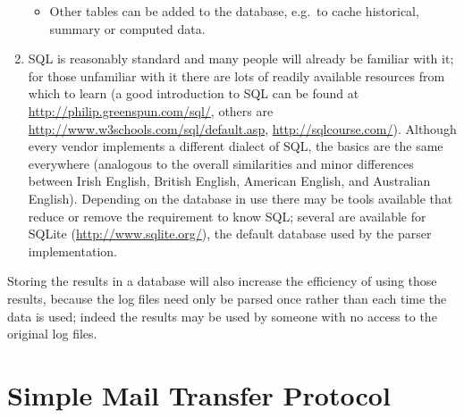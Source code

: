 \begin{enumerate}
\begin{itemize}
            \item Other tables can be added to the database, e.g.\ to cache
                historical, summary or computed data.

        \end{itemize}


    \item \gls{SQL} is reasonably standard and many people will already be
        familiar with it; for those unfamiliar with it there are lots of
        readily available resources from which to learn (a good
        introduction to \gls{SQL} can be found at
        \url{http://philip.greenspun.com/sql/}, others are
        \url{http://www.w3schools.com/sql/default.asp},
        \url{http://sqlcourse.com/}).  Although every vendor implements a
        different dialect of \gls{SQL}, the basics are the same everywhere
        (analogous to the overall similarities and minor differences
        between Irish English, British English, American English, and
        Australian English).  Depending on the database in use there may be
        tools available that reduce or remove the requirement to know
        \gls{SQL}; several are available for \gls{SQLite}
        (\url{http://www.sqlite.org/}), the default database used by the
        parser implementation.

\end{enumerate}

Storing the results in a database will also increase the efficiency of
using those results, because the log files need only be parsed once rather
than each time the data is used; indeed the results may be used by someone
with no access to the original log files.



\section{Simple Mail Transfer Protocol}

\label{SMTP background}

